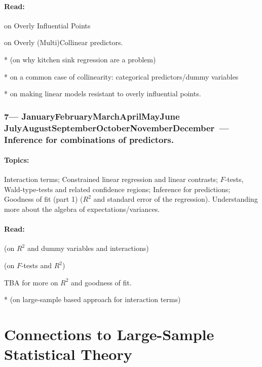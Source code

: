 \documentclass[10pt]{article}
\def\themonth{\ifcase\month\or
  January\or February\or March\or April\or May\or June\or
  July\or August\or September\or October\or November\or December\fi}
\begin{document}
\subsection{Read:}
\citealp[Chap 11]{fox2008applied} on Overly Influential Points 

\citealp[Chap 13]{fox2008applied} on Overly (Multi)Collinear predictors.

*\citealp{ache:02} (on why kitchen sink regression are a problem)

*\citealp[Chap 7]{fox2008applied} on a common case of collinearity:
categorical predictors/dummy variables

*\citealp[Chap 19]{fox2008applied} on making linear models resistant to overly influential points.

\AdvanceDate[7]
\section{7---\themonth~\the\day---Inference for combinations of
  predictors.}


\subsection{Topics:} Interaction terms; Constrained linear regression
and linear contrasts; $F$-tests, Wald-type-tests and
related confidence regions; Inference for predictions; Goodness of fit
(part 1) ($R^2$ and standard error of the regression). Understanding
more about the algebra of expectations/variances.

\subsection{Read:}
\citealp[Chap 5.2.3,7, 8.5]{fox2008applied} (on $R^2$ and dummy variables and interactions)

\citealp[Chap 16]{kaplan2009ism} (on $F$-tests and $R^2$)

TBA for more on $R^2$ and goodness of fit.

*\citealp{BramClarGold:2006} (on large-sample based approach for interaction terms)


\part{Connections to Large-Sample Statistical Theory}
\end{document}
